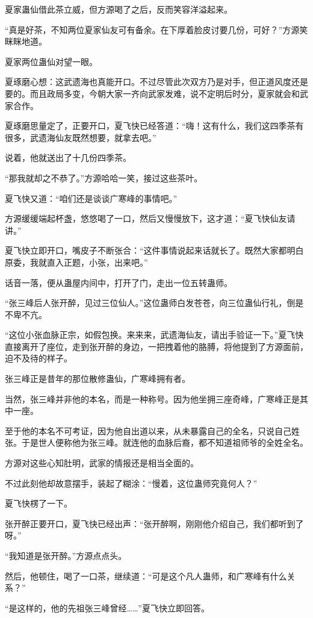 \begin{this_body}
夏家蛊仙借此茶立威，但方源喝了之后，反而笑容洋溢起来。

“真是好茶，不知两位夏家仙友可有备余。在下厚着脸皮讨要几份，可好？”方源笑眯眯地道。

夏家两位蛊仙对望一眼。

夏琢磨心想：这武遗海也真能开口。不过尽管此次双方乃是对手，但正道风度还是要的。而且政局多变，今朝大家一齐向武家发难，说不定明后时分，夏家就会和武家合作。

夏琢磨思量定了，正要开口，夏飞快已经答道：“嗨！这有什么，我们这四季茶有很多，武遗海仙友既然想要，就拿去吧。”

说着，他就送出了十几份四季茶。

“那我就却之不恭了。”方源哈哈一笑，接过这些茶叶。

夏飞快又道：“咱们还是谈谈广寒峰的事情吧。”

方源缓缓端起杯盏，悠悠喝了一口，然后又慢慢放下，这才道：“夏飞快仙友请讲。”

夏飞快立即开口，嘴皮子不断张合：“这件事情说起来话就长了。既然大家都明白原委，我就直入正题，小张，出来吧。”

话音一落，便从蛊屋内间中，打开了门，走出一位五转蛊师。

“张三峰后人张开醉，见过三位仙人。”这位蛊师白发苍苍，向三位蛊仙行礼，倒是不卑不亢。

“这位小张血脉正宗，如假包换。来来来，武遗海仙友，请出手验证一下。”夏飞快直接离开了座位，走到张开醉的身边，一把拽着他的胳膊，将他提到了方源面前，迫不及待的样子。

张三峰正是昔年的那位散修蛊仙，广寒峰拥有者。

当然，张三峰并非他的本名，而是一种称号。因为他坐拥三座奇峰，广寒峰正是其中一座。

至于他的本名不可考证，因为他自出道以来，从未暴露自己的全名，只说自己姓张。于是世人便称他为张三峰。就连他的血脉后裔，都不知道祖师爷的全姓全名。

方源对这些心知肚明，武家的情报还是相当全面的。

不过此刻他却故意摆手，装起了糊涂：“慢着，这位蛊师究竟何人？”

夏飞快楞了一下。

张开醉正要开口，夏飞快已经出声：“张开醉啊，刚刚他介绍自己，我们都听到了呀。”

“我知道是张开醉。”方源点点头。

然后，他顿住，喝了一口茶，继续道：“可是这个凡人蛊师，和广寒峰有什么关系？”

“是这样的，他的先祖张三峰曾经……”夏飞快立即回答。


\end{this_body}
